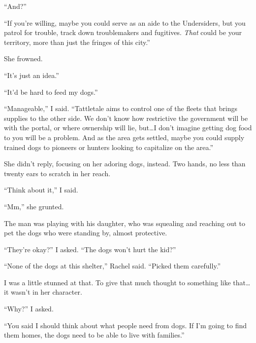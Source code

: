 ``And?''



``If you're willing, maybe you could serve as an aide to the Undersiders, but you patrol for trouble, track down troublemakers and fugitives.  \emph{That} could be your territory, more than just the fringes of this city.''



She frowned.



``It's just an idea.''



``It'd be hard to feed my dogs.''



``Manageable,'' I said.  ``Tattletale aims to control one of the fleets that brings supplies to the other side.  We don't know how restrictive the government will be with the portal, or where ownership will lie, but\ldots I don't imagine getting dog food to you will be a problem.  And as the area gets settled, maybe you could supply trained dogs to pioneers or hunters looking to capitalize on the area.''



She didn't reply, focusing on her adoring dogs, instead.  Two hands, no less than twenty ears to scratch in her reach.



``Think about it,'' I said.



``Mm,'' she grunted.



The man was playing with his daughter, who was squealing and reaching out to pet the dogs who were standing by, almost protective.



``They're okay?'' I asked.  ``The dogs won't hurt the kid?''



``None of the dogs at this shelter,'' Rachel said.  ``Picked them carefully.''



I was a little stunned at that.  To give that much thought to something like that\ldots it wasn't in her character.



``Why?'' I asked.



``You said I should think about what people need from dogs.  If I'm going to find them homes, the dogs need to be able to live with families.''



